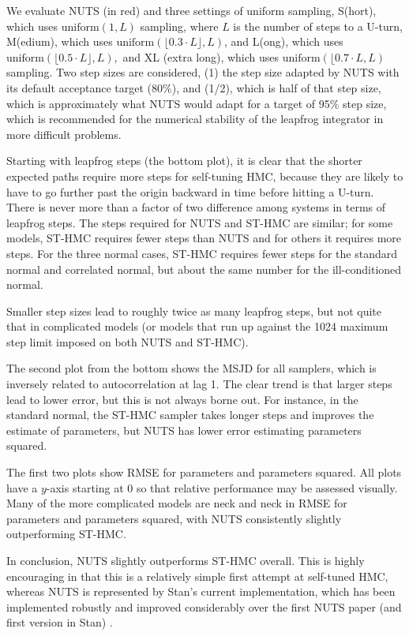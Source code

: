 \documentclass[letterpaper,11pt]{article}
\theoremstyle{plain}%
\theoremstyle{remark}
\begin{document}
We evaluate NUTS (in red) and three settings of uniform sampling, S(hort), which uses $\textrm{uniform}(1, L)$ sampling, where $L$ is the number of steps to a U-turn, M(edium), which uses $\textrm{uniform}(\lfloor 0.3 \cdot L \rfloor, L)$, and L(ong), which uses $\textrm{uniform}(\lfloor 0.5 \cdot L \rfloor, L),$ and XL (extra long), which uses $\textrm{uniform}(\lfloor 0.7 \cdot L, L)$ sampling.  Two step sizes are considered, (1) the step size adapted by NUTS with its default acceptance target (80\%), and (1/2), which is half of that step size, which is approximately what NUTS would adapt for a target of 95\% step size, which is recommended for the numerical stability of the leapfrog integrator in more difficult problems.

Starting with leapfrog steps (the bottom plot), it is clear that the shorter expected paths require more steps for self-tuning HMC, because they are likely to have to go further past the origin backward in time before hitting a U-turn.  There is never more than a factor of two difference among systems in terms of leapfrog steps.  The steps required for NUTS and ST-HMC are similar; for some models, ST-HMC requires fewer steps than NUTS and for others it requires more steps. For the three normal cases, ST-HMC requires fewer steps for the standard normal and correlated normal, but about the same number for the ill-conditioned normal.

Smaller step sizes lead to roughly twice as many leapfrog steps, but not quite that in complicated models (or models that run up against the 1024 maximum step limit imposed on both NUTS and ST-HMC).

The second plot from the bottom shows the MSJD for all samplers, which is inversely related to autocorrelation at lag 1.  The clear trend is that larger steps lead to lower error, but this is not always borne out.  For instance, in the standard normal, the ST-HMC sampler takes longer steps and improves the estimate of parameters, but NUTS has lower error estimating parameters squared.

The first two plots show RMSE for parameters and parameters squared.  All plots have a $y$-axis starting at 0 so that relative performance may be assessed visually.  Many of the more complicated models are neck and neck in RMSE for parameters and parameters squared, with NUTS consistently slightly outperforming ST-HMC.  

In conclusion, NUTS slightly outperforms ST-HMC overall.  This is highly encouraging in that this is a relatively simple first attempt at self-tuned HMC, whereas NUTS is represented by Stan's current implementation, which has been implemented robustly and improved considerably over the first NUTS paper (and first version in Stan) \cite{betancourt2017conceptual,HoGe2014}.
\end{document}
